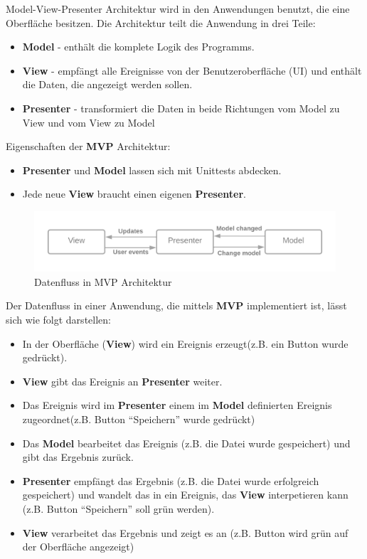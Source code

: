 Model-View-Presenter Architektur wird in den Anwendungen benutzt, die eine Oberfläche besitzen. \nocite{MVP}
Die Architektur teilt die Anwendung in drei Teile:
\begin{itemize}
    \item \textbf{Model} - enthält die komplete Logik des Programms.
    \item \textbf{View} - empfängt alle Ereignisse von der Benutzeroberfläche (UI) und enthält die Daten, die angezeigt werden sollen.
    \item \textbf{Presenter} - transformiert die Daten in beide Richtungen vom Model zu View 
    und vom View zu Model
\end{itemize}


Eigenschaften der \textbf{MVP} Architektur:
\begin{itemize}
    \item \textbf{Presenter} und \textbf{Model} lassen sich mit Unittests abdecken.
    \item Jede neue \textbf{View} braucht einen eigenen \textbf{Presenter}.
\end{itemize}

\begin{figure}[H]
    \centering
    \includegraphics[width=1\textwidth]{./images/MVP.png}
    \caption[Datenfluss in MVP Architektur]{Datenfluss in MVP Architektur}
    \label{fig:MVP}
\end{figure}

Der Datenfluss in einer Anwendung, die mittels \textbf{MVP} implementiert ist, lässt sich wie folgt darstellen:
\begin{itemize}
    \item In der Oberfläche (\textbf{View}) wird ein Ereignis erzeugt(z.B. ein Button wurde gedrückt).
    \item \textbf{View} gibt das Ereignis an \textbf{Presenter} weiter.
    \item Das Ereignis wird im \textbf{Presenter} einem im \textbf{Model} definierten Ereignis zugeordnet(z.B. Button ``Speichern'' wurde gedrückt)
    \item Das \textbf{Model} bearbeitet das Ereignis (z.B. die Datei wurde gespeichert) und gibt das Ergebnis zurück.
    \item \textbf{Presenter} empfängt das Ergebnis (z.B. die Datei wurde erfolgreich gespeichert) und wandelt das in ein Ereignis,
    das \textbf{View} interpetieren kann (z.B. Button ``Speichern'' soll grün werden).
    \item \textbf{View} verarbeitet das Ergebnis und zeigt es an (z.B. Button wird grün auf der Oberfläche angezeigt)
\end{itemize}